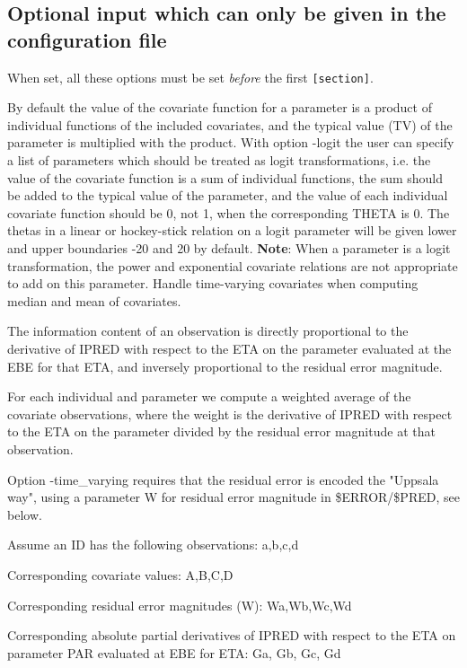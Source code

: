 \subsection{Optional input which can only be given in the configuration file}
When set, all these options must be set \emph{before} the first \verb|[section]|.
\begin{optionlist}
By default the value of the covariate function for a parameter is a product of individual functions of the included covariates, and the typical value (TV) of the parameter is multiplied with the product. With option -logit the user can specify a list of parameters which should be treated as logit transformations, i.e. the value of the covariate function is a sum of individual functions, the sum should be added to the typical value of the parameter, and the value of each individual covariate function should be 0, not 1, when the corresponding THETA is 0. The thetas in a linear or hockey-stick relation on a logit parameter will be given lower and upper boundaries -20 and 20 by default. \textbf{Note}: When a parameter is a logit transformation, the power and exponential covariate relations are not appropriate to add on this parameter. 
\nextopt
{}
Handle time-varying covariates when computing median and mean of covariates.
	
The information content of an observation is directly proportional to the derivative of IPRED with respect to the ETA on the parameter evaluated at the EBE for that ETA, and inversely proportional to the residual error magnitude.

For each individual and parameter we compute a weighted average of the covariate observations, where the weight is the derivative of IPRED with respect to the ETA on the parameter divided by the residual error magnitude at that observation.
	
Option -time\_varying requires that the residual error is encoded the "Uppsala way", using a parameter W for residual error magnitude in \$ERROR/\$PRED, see below.
	
Assume an ID has the following observations: a,b,c,d
	
Corresponding covariate values: A,B,C,D
	
Corresponding residual error magnitudes (W): Wa,Wb,Wc,Wd
	
Corresponding absolute partial derivatives of IPRED with respect to the ETA on parameter PAR evaluated at EBE for ETA: Ga, Gb, Gc, Gd
	

\end{optionlist}
